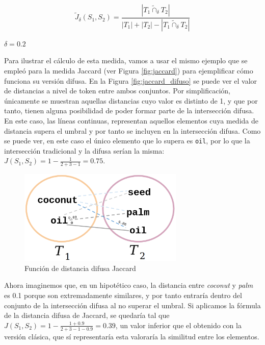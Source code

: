 \begin{equation}
    \label{formula:jaccard_fuz}
    \tilde{J}_{\delta}(S_{1},S_{2})=\frac{\left | T_{1} \tilde{\cap}_{\delta} T_{2}\right |}{\left | T_{1} \right |+\left | T_{2} \right |-\left | T_{1}\tilde{\cap}_{\delta} T_{2} \right |}
\end{equation}
\begin{center}
    $\delta=0.2$
\end{center}

Para ilustrar el cálculo de esta medida, vamos a usar el mismo ejemplo que se empleó para la medida Jaccard (ver Figura \ref{fig:jaccard}) para ejemplificar cómo funciona su versión difusa. En la Figura \ref{fig:jaccard_difuso} se puede ver el valor de distancias a nivel de token entre ambos conjuntos.  Por simplificación, únicamente se muestran aquellas distancias cuyo valor es distinto de 1, y que por tanto, tienen alguna posibilidad de poder formar parte de la intersección difusa. En este caso, las líneas continuas, representan aquellos elementos cuya medida de distancia supera el umbral y por tanto se incluyen en la intersección difusa. Como se puede ver, en este caso el único elemento que lo supera es \texttt{oil}, por lo que la intersección tradicional y la difusa serían la misma: $J(S_{1},S_{2})=1-\frac{1}{2+3-1} = 0.75$.

\begin{figure}[H]
    \centering
    \includegraphics[width=0.7\textwidth]{imagenes/img4.png}
    \caption{Función de distancia difusa Jaccard}
    \label{fig:fuzzy_jaccard_metric}
\end{figure}


Ahora imaginemos que, en un hipotético caso, la distancia entre \textit{coconut} y \textit{palm} es 0.1 porque son extremadamente similares, y por tanto entraría dentro del conjunto de la intersección difusa al no superar el umbral. Si aplicamos la fórmula de la distancia difusa de Jaccard, se quedaría tal que $J(S_{1},S_{2})=1-\frac{1+0.9}{2+3-1-0.9} = 0.39$, un valor inferior que el obtenido con la versión clásica, que sí representaría esta valoraría la similitud entre los elementos.

